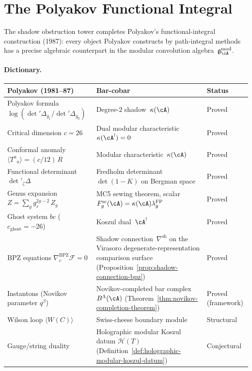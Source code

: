 \section{The Polyakov Functional Integral}
\label{sec:concordance-polyakov-programme}

The shadow obstruction tower completes Polyakov's functional-integral construction
(1987): every object Polyakov constructs by path-integral methods
has a precise algebraic counterpart in the modular convolution
algebra~$\mathfrak{g}^{\mathrm{mod}}_\cA$.

\paragraph{Dictionary.}

\begin{center}
\renewcommand{\arraystretch}{1.25}
\begin{tabular}{@{}p{4.8cm}p{5.6cm}l@{}}
\toprule
\textbf{Polyakov (1981--87)} & \textbf{Bar-cobar} & \textbf{Status} \\
\midrule
Polyakov formula
 $\log(\det'\!\Delta_{g_1}/\det'\!\Delta_{g_0})$
 & Degree-$2$ shadow~$\kappa(\cA)$
 & Proved \\
Critical dimension $c = 26$
 & Dual modular characteristic
 $\kappa(\cA^!) = 0$
 & Proved \\
Conformal anomaly
 $\langle T^a{}_a \rangle = (c/12)\,R$
 & Modular characteristic~$\kappa(\cA)$
 & Proved \\
Functional determinant $\det'_\zeta\!\Delta$
 & Fredholm determinant $\det(1 - K)$
 on Bergman space
 & Proved \\
Genus expansion
 $Z = \sum_g g_s^{2g-2}\,Z_g$
 & MC5 sewing theorem,
 scalar
 $F_g^{\mathrm{sc}}(\cA)=\kappa(\cA)\lambda_g^{\mathrm{FP}}$
 & Proved \\
Ghost system $bc$
 ($c_{\mathrm{ghost}} = -26$)
 & Koszul dual~$\cA^!$
 & Proved \\
BPZ equations
 $\nabla^{\mathrm{BPZ}}_c \mathcal{F} = 0$
 & Shadow connection~$\nabla^{\mathrm{sh}}$ on the Virasoro
 degenerate-representation comparison surface
 \textup{(}Proposition~\ref{prop:shadow-connection-bpz}\textup{)}
 & Proved \\
Instantons (Novikov parameter $q^\beta$)
 & Novikov-completed bar complex
 $B^\Lambda(\cA)$
 (Theorem~\ref{thm:novikov-completion-theorem})
 & Proved (framework) \\
Wilson loop $\langle W(C) \rangle$
 & Swiss-cheese boundary module
 & Structural \\
Gauge/string duality
 & Holographic modular Koszul datum
 $\mathcal{H}(T)$
 (Definition~\ref{def:holographic-modular-koszul-datum})
 & Conjectural \\
\bottomrule
\end{tabular}
\end{center}

